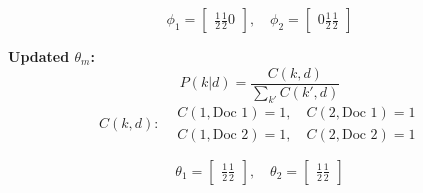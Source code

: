 \documentclass{article}
\begin{document}
\[
\phi_1 =
\begin{bmatrix}
\frac{1}{2} %
\frac{1}{2} %
0            %
\end{bmatrix}, \quad
\phi_2 =
\begin{bmatrix}
0             %
\frac{1}{2}  %
\frac{1}{2}  %
\end{bmatrix}
\]

\textbf{Updated \( \theta_m \):}
\[
P(k|d) = \frac{C(k, d)}{\sum_{k'} C(k', d)}
\]
\[
C(k, d):
\begin{aligned}
    &C(1, \text{Doc 1}) = 1, \quad C(2, \text{Doc 1}) = 1 \\
    &C(1, \text{Doc 2}) = 1, \quad C(2, \text{Doc 2}) = 1
\end{aligned}
\]

\[
\theta_1 =
\begin{bmatrix}
\frac{1}{2}  %
\frac{1}{2}  %
\end{bmatrix}, \quad
\theta_2 =
\begin{bmatrix}
\frac{1}{2}  %
\frac{1}{2}  %
\end{bmatrix}
\]
\end{document}
